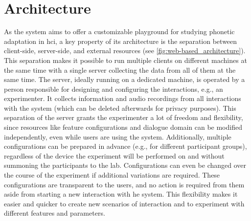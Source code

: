 \section{Architecture}
\label{sec:architecture}

As the system aims to offer a customizable playground for studying phonetic adaptation in \ac{hci}, a key property of its architecture is the separation between client-side, server-side, and external resources (see \cref{fig:web-based_architecture}).
This separation makes it possible to run multiple clients on different machines at the same time with a single server collecting the data from all of them at the same time.
The server, ideally running on a dedicated machine, is operated by a person responsible for designing and configuring the interactions, e.g., an experimenter.
It collects information and audio recordings from all interactions with the system (which can be deleted afterwards for privacy purposes).
This separation of the server grants the experimenter a lot of freedom and flexibility, since resources like feature configurations and dialogue domain can be modified independently, even while users are using the system.
Additionally, multiple configurations can be prepared in advance (e.g., for different participant groups), regardless of the device the experiment will be performed on and without summoning the participants to the lab.
Configurations can even be changed over the course of the experiment if additional variations are required.
These configurations are transparent to the users, and no action is required from them aside from starting a new interaction with he system.
This flexibility makes it easier and quicker to create new scenarios of interaction and to experiment with different features and parameters.

